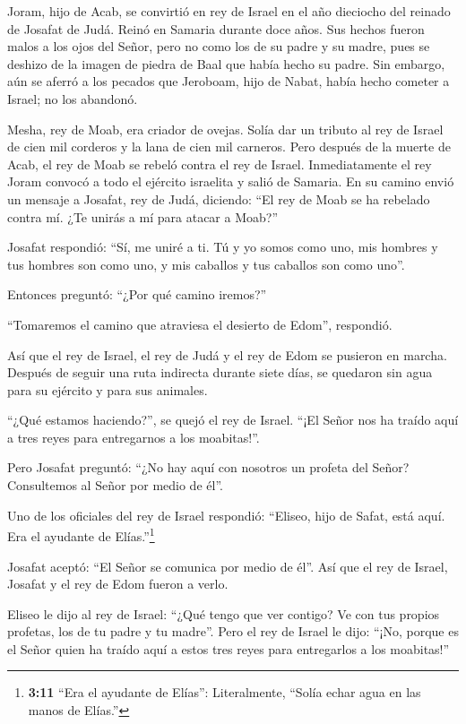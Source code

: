  Joram, hijo de Acab, se convirtió en rey de Israel en el
año dieciocho del reinado de Josafat de Judá. Reinó en Samaria durante
doce años.  Sus hechos fueron malos a los ojos del Señor,
pero no como los de su padre y su madre, pues se deshizo de la imagen de
piedra de Baal que había hecho su padre.  Sin embargo, aún
se aferró a los pecados que Jeroboam, hijo de Nabat, había hecho cometer
a Israel; no los abandonó.

 Mesha, rey de Moab, era criador de ovejas. Solía dar un
tributo al rey de Israel de cien mil corderos y la lana de cien mil
carneros.  Pero después de la muerte de Acab, el rey de Moab
se rebeló contra el rey de Israel.  Inmediatamente el rey
Joram convocó a todo el ejército israelita y salió de Samaria.
 En su camino envió un mensaje a Josafat, rey de Judá,
diciendo: ``El rey de Moab se ha rebelado contra mí. ¿Te unirás a mí
para atacar a Moab?''

Josafat respondió: ``Sí, me uniré a ti. Tú y yo somos como uno, mis
hombres y tus hombres son como uno, y mis caballos y tus caballos son
como uno''.

 Entonces preguntó: ``¿Por qué camino iremos?''

``Tomaremos el camino que atraviesa el desierto de Edom'', respondió.

 Así que el rey de Israel, el rey de Judá y el rey de Edom
se pusieron en marcha. Después de seguir una ruta indirecta durante
siete días, se quedaron sin agua para su ejército y para sus animales.

 ``¿Qué estamos haciendo?'', se quejó el rey de Israel.
``¡El Señor nos ha traído aquí a tres reyes para entregarnos a los
moabitas!''.

 Pero Josafat preguntó: ``¿No hay aquí con nosotros un
profeta del Señor? Consultemos al Señor por medio de él''.

Uno de los oficiales del rey de Israel respondió: ``Eliseo, hijo de
Safat, está aquí. Era el ayudante de Elías.''\footnote{\textbf{3:11}
  ``Era el ayudante de Elías'': Literalmente, ``Solía echar agua en las
  manos de Elías.''}

 Josafat aceptó: ``El Señor se comunica por medio de él''.
Así que el rey de Israel, Josafat y el rey de Edom fueron a verlo.

 Eliseo le dijo al rey de Israel: ``¿Qué tengo que ver
contigo? Ve con tus propios profetas, los de tu padre y tu madre''. Pero
el rey de Israel le dijo: ``¡No, porque es el Señor quien ha traído aquí
a estos tres reyes para entregarlos a los moabitas!''

